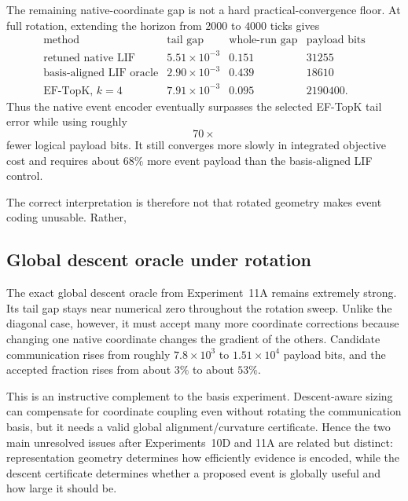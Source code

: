 The remaining native-coordinate gap is not a hard practical-convergence floor. At full rotation, extending the horizon from $2000$ to $4000$ ticks gives
\begin{equation}
  \begin{array}{lccc}
  \text{method} & \text{tail gap} & \text{whole-run gap} & \text{payload bits}\\
  \hline
  \text{retuned native LIF} & 5.51\times10^{-3} & 0.151 & 31255\\
  \text{basis-aligned LIF oracle} & 2.90\times10^{-3} & 0.439 & 18610\\
  \text{EF-TopK, }k=4 & 7.91\times10^{-3} & 0.095 & 2190400.
  \end{array}
\end{equation}
Thus the native event encoder eventually surpasses the selected EF-TopK tail error while using roughly
\begin{equation}
  \boxed{70\times}
\end{equation}
fewer logical payload bits. It still converges more slowly in integrated objective cost and requires about $68\%$ more event payload than the basis-aligned LIF control.

The correct interpretation is therefore not that rotated geometry makes event coding unusable. Rather,
\begin{center}
\end{center}

\subsection{Global descent oracle under rotation}

The exact global descent oracle from Experiment~11A remains extremely strong. Its tail gap stays near numerical zero throughout the rotation sweep. Unlike the diagonal case, however, it must accept many more coordinate corrections because changing one native coordinate changes the gradient of the others. Candidate communication rises from roughly $7.8\times10^3$ to $1.51\times10^4$ payload bits, and the accepted fraction rises from about $3\%$ to about $53\%$.

This is an instructive complement to the basis experiment. Descent-aware sizing can compensate for coordinate coupling even without rotating the communication basis, but it needs a valid global alignment/curvature certificate. Hence the two main unresolved issues after Experiments~10D and 11A are related but distinct: representation geometry determines how efficiently evidence is encoded, while the descent certificate determines whether a proposed event is globally useful and how large it should be.

